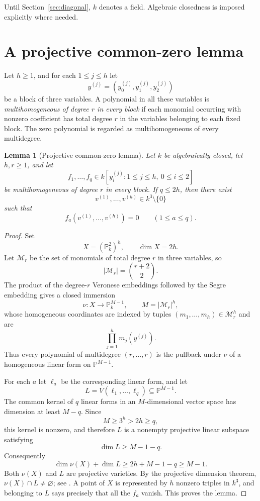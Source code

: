 \documentclass[11pt]{article}
\newtheorem{lemma}[theorem]{Lemma}
\newcommand{\PP}{\mathbb P}
\begin{document}
Until Section~\ref{sec:diagonal}, $k$ denotes a field.  Algebraic closedness is imposed explicitly where needed.

\section{A projective common-zero lemma}\label{sec:projective}

Let $h\ge1$, and for each $1\le j\le h$ let
\[
y^{(j)}=(y^{(j)}_0,y^{(j)}_1,y^{(j)}_2)
\]
be a block of three variables.  A polynomial in all these variables is \emph{multihomogeneous of degree $r$ in every block} if each monomial occurring with nonzero coefficient has total degree $r$ in the variables belonging to each fixed block.  The zero polynomial is regarded as multihomogeneous of every multidegree.

\begin{lemma}[Projective common-zero lemma]\label{lem:projective}
Let $k$ be algebraically closed, let $h,r\ge1$, and let
\[
f_1,\ldots,f_q\in k[y_i^{(j)}:1\le j\le h,\ 0\le i\le2]
\]
be multihomogeneous of degree $r$ in every block.  If $q\le2h$, then there exist
\[
v^{(1)},\ldots,v^{(h)}\in k^3\setminus\{0\}
\]
such that
\[
f_a(v^{(1)},\ldots,v^{(h)})=0
\qquad(1\le a\le q).
\]
\end{lemma}

\begin{proof}
Set
\[
X=(\PP^2_k)^h,
\qquad \dim X=2h.
\]
Let $\mathcal M_r$ be the set of monomials of total degree $r$ in three variables, so
\[
|\mathcal M_r|=\binom{r+2}{2}.
\]
The product of the degree-$r$ Veronese embeddings followed by the Segre embedding gives a closed immersion
\[
\nu:X\longrightarrow\PP^{M-1}_k,
\qquad
M=|\mathcal M_r|^h,
\]
whose homogeneous coordinates are indexed by tuples $(m_1,\ldots,m_h)\in\mathcal M_r^h$ and are
\[
\prod_{j=1}^h m_j(y^{(j)}).
\]
Thus every polynomial of multidegree $(r,\ldots,r)$ is the pullback under $\nu$ of a homogeneous linear form on $\PP^{M-1}$.

For each $a$ let $\ell_a$ be the corresponding linear form, and let
\[
L=V(\ell_1,\ldots,\ell_q)\subseteq\PP^{M-1}.
\]
The common kernel of $q$ linear forms in an $M$-dimensional vector space has dimension at least $M-q$.  Since
\[
M\ge3^h>2h\ge q,
\]
this kernel is nonzero, and therefore $L$ is a nonempty projective linear subspace satisfying
\[
\dim L\ge M-1-q.
\]
Consequently
\[
\dim\nu(X)+\dim L
\ge 2h+M-1-q
\ge M-1.
\]
Both $\nu(X)$ and $L$ are projective varieties.  By the projective dimension theorem, $\nu(X)\cap L\ne\varnothing$; see \cite[Chapter I, Theorem 7.2]{Hartshorne}.  A point of $X$ is represented by $h$ nonzero triples in $k^3$, and belonging to $L$ says precisely that all the $f_a$ vanish.  This proves the lemma.
\end{proof}
\end{document}
